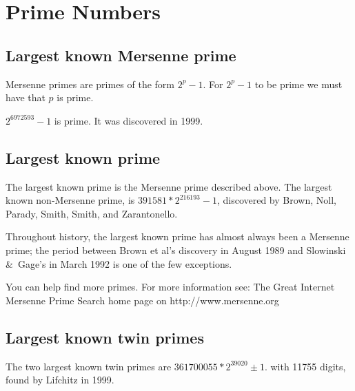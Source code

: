 

\section{Prime Numbers}
    
\subsection{Largest known Mersenne prime}

 Mersenne primes are primes of the form $2^p-1$. For $2^p-1$ to be prime
    we must have that $p$ is prime. 


 $2^{6972593}-1$ is prime. It was discovered in 1999.

	
\subsection{Largest known prime}

The largest known prime is the Mersenne prime described above.
    The largest known non-Mersenne prime, is $391581*2^{216193}-1$,
    discovered by Brown, Noll, Parady, Smith, Smith, and Zarantonello. 

   Throughout history, the largest known prime has almost always been
    a Mersenne prime; the period between Brown et al's discovery in 
    August 1989 and Slowinski \&\ Gage's in March 1992 is one of the few 
    exceptions.

You can help find more primes. For more information see:
The Great Internet Mersenne Prime Search home page
on http://www.mersenne.org 

\Ref

	
\subsection{Largest known twin primes}


The two largest known twin primes are $361700055 * 2^39020 \pm 1$.
with 11755 digits, found by Lifchitz in 1999.
	
